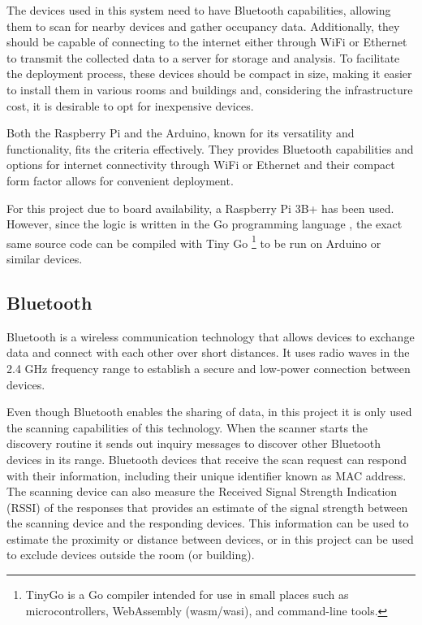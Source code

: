 \documentclass[a4paper, 11pt]{article}
\begin{document}
The devices used in this system need to have Bluetooth capabilities, allowing them to scan for nearby devices and gather occupancy data. Additionally, they should be capable of connecting to the internet either through WiFi or Ethernet to transmit the collected data to a server for storage and analysis. To facilitate the deployment process, these devices should be compact in size, making it easier to install them in various rooms and buildings and, considering the infrastructure cost, it is desirable to opt for inexpensive devices.

Both the Raspberry Pi and the Arduino, known for its versatility and functionality, fits the criteria effectively. They provides Bluetooth capabilities and options for internet connectivity through WiFi or Ethernet and their compact form factor allows for convenient deployment.

For this project due to board availability, a Raspberry Pi 3B+ has been used. However, since the logic is written in the Go programming language \cite{golang}, the exact same source code can be compiled with Tiny Go \cite{tinygo} \footnote{TinyGo is a Go compiler intended for use in small places such as microcontrollers, WebAssembly (wasm/wasi), and command-line tools.} to be run on Arduino or similar devices.

\subsection{Bluetooth}
Bluetooth is a wireless communication technology that allows devices to exchange data and connect with each other over short distances. It uses radio waves in the 2.4 GHz frequency range to establish a secure and low-power connection between devices.

Even though Bluetooth enables the sharing of data, in this project it is only used the scanning capabilities of this technology. When the scanner starts the discovery routine it sends out inquiry messages to discover other Bluetooth devices in its range. Bluetooth devices that receive the scan request can respond with their information, including their unique identifier known as MAC address. The scanning device can also measure the Received Signal Strength Indication (RSSI) of the responses that provides an estimate of the signal strength between the scanning device and the responding devices. This information can be used to estimate the proximity or distance between devices, or in this project can be used to exclude devices outside the room (or building). 
\end{document}
